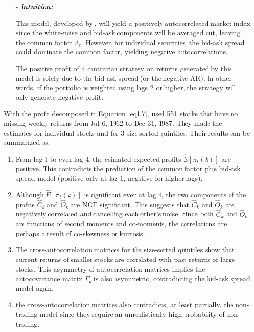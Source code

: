 \begin{enumerate}
\begin{enumerate}
        \item[-] \textbf{\textit{Intuition:}}
        
        This model, developed by \citet{roll1984simple}, will yield a positively autocorrelated market index since the white-noise and bid-ask components will be averaged out, leaving
        the common factor $\Lambda_t$. However, for individual securities, the bid-ask spread could dominate the common factor, yielding negative autocorrelations.

        The positive profit of a contrarian strategy on returns generated by this model is solely due to the bid-ask spread (or the negative AR). In other words, if the portfolio is weighted using 
        lags 2 or higher, the strategy will only generate negative profit.
    \end{enumerate}
\end{enumerate}

With the profit decomposed in Equation \eqref{eq1.7}, \citeauthor*{lo1990contrarian} used 551 stocks that have no missing weekly returns from Jul 6, 1962 to Dec 31, 1987. They made the estimates for 
individual stocks and for 3 size-sorted quintiles. Their results can be summarized as:
\begin{enumerate}
    \item From lag 1 to even lag 4, the esimated expected profits $\hat{E}[\pi_t(k)]$ are positive. This contradicts the prediction of the common factor plus bid-ask spread model (positive only at lag 1, negative for higher lags).
    \item Although $\hat{E}[\pi_t(k)]$ is significant even at lag 4, the two components of the profits $\hat{C}_k$ and $\hat{O}_k$ are NOT significant. This suggests that $\hat{C}_k$ and $\hat{O}_k$ are negatively correlated and
    cancelling each other's noise. Since both $\hat{C}_k$ and $\hat{O}_k$ are functions of second moments and co-moments, the correlations are perhaps a result of co-skewness or kurtosis.
    \item The cross-autocorrelation matrices for the size-sorted quintiles show that current returns of smaller stocks are correlated with past returns of large stocks. This asymmetry of autocorrelation matrices implies the 
    autocovariance matrix $\Gamma_k$ is also asymmetric, contradicting the bid-ask spread model again.
    \item the cross-autocorrelation matrices also contradicts, at least partially, the non-trading model since they require an unrealistically high probability of non-trading.
\end{enumerate}

